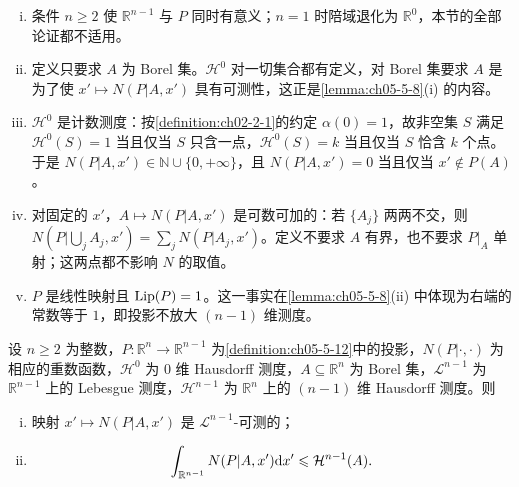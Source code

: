 \documentclass[../../main.tex]{subfiles}%
\begin{document}
\begin{remark}\label{remark:ch05-def-5-12-条件}
\begin{enumerate}[(i)]
\item 条件 $n\geqslant2$ 使 $\mathbb{R}^{n-1}$ 与 $P$ 同时有意义；$n=1$ 时陪域退化为 $\mathbb{R}^0$，本节的全部论证都不适用。
\item 定义只要求 $A$ 为 Borel 集。$\mathcal{H}^0$ 对一切集合都有定义，对 Borel 集要求 $A$ 是为了使 $x'\mapsto N(P|A,x')$ 具有可测性，这正是\cref{lemma:ch05-5-8}(i) 的内容。%
\item $\mathcal{H}^0$ 是计数测度：按\cref{definition:ch02-2-1}的约定 $\alpha(0)=1$，故非空集 $S$ 满足 $\mathcal{H}^0(S)=1$ 当且仅当 $S$ 只含一点，$\mathcal{H}^0(S)=k$ 当且仅当 $S$ 恰含 $k$ 个点。于是 $N(P|A,x')\in\mathbb{N}\cup\{0,+\infty\}$，且 $N(P|A,x')=0$ 当且仅当 $x'\notin P(A)$。%
\item 对固定的 $x'$，$A\mapsto N(P|A,x')$ 是可数可加的：若 $\{A_j\}$ 两两不交，则 $N(P|\bigcup_jA_j,x')=\sum_jN(P|A_j,x')$。定义不要求 $A$ 有界，也不要求 $P|_A$ 单射；这两点都不影响 $N$ 的取值。
\item $P$ 是线性映射且 $\operatorname{Lip}(P)=1$。这一事实在\cref{lemma:ch05-5-8}(ii) 中体现为右端的常数等于 $1$，即投影不放大 $(n-1)$ 维测度。%
\end{enumerate}
\end{remark}

\begin{lemma}\label{lemma:ch05-5-8}
设 $n\geqslant2$ 为整数，$P:\mathbb{R}^n\to\mathbb{R}^{n-1}$ 为\cref{definition:ch05-5-12}中的投影，$N(P|\cdot,\cdot)$ 为相应的重数函数，$\mathcal{H}^0$ 为 $0$ 维 Hausdorff 测度，$A\subseteq\mathbb{R}^n$ 为 Borel 集，$\mathcal{L}^{n-1}$ 为 $\mathbb{R}^{n-1}$ 上的 Lebesgue 测度，$\mathcal{H}^{n-1}$ 为 $\mathbb{R}^n$ 上的 $(n-1)$ 维 Hausdorff 测度。则 %
\begin{enumerate}[(i)]
\item 映射 $x'\mapsto N(P|A,x')$ 是 $\mathcal{L}^{n-1}$-可测的；
\item
\begin{align*}
\int_{\mathbb{R}^{n-1}}N(P|A,x')\mathrm{d} x'\leqslant\mathcal{H}^{n-1}(A).
\end{align*}
\end{enumerate}
\end{lemma}
\end{document}
